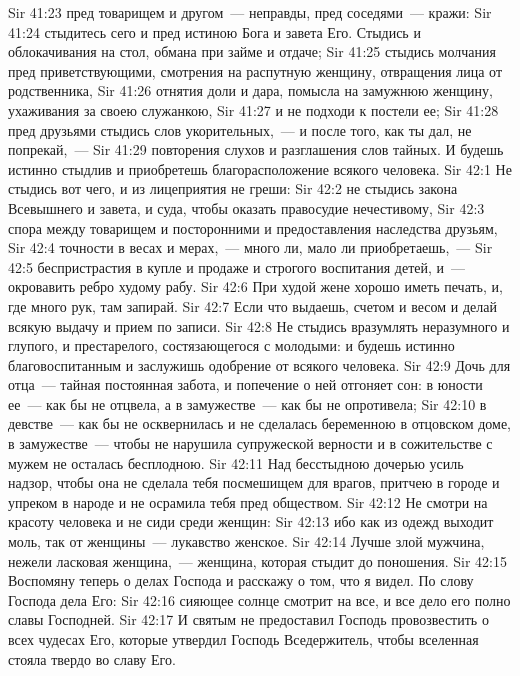 \vs Sir 41:23 пред товарищем и другом~--- неправды, пред соседями~--- кражи:
\vs Sir 41:24 стыдитесь сего и пред истиною Бога и завета Его. Стыдись и облокачивания на стол, обмана при займе и отдаче;
\vs Sir 41:25 стыдись молчания пред приветствующими, смотрения на распутную женщину, отвращения лица от родственника,
\vs Sir 41:26 отнятия доли и дара, помысла на замужнюю женщину, ухаживания за своею служанкою,
\vs Sir 41:27 и не подходи к постели ее;
\vs Sir 41:28 пред друзьями стыдись слов укорительных,~--- и после того, как ты дал, не попрекай,~---
\vs Sir 41:29 повторения слухов и разглашения слов тайных. И будешь истинно стыдлив и приобретешь благорасположение всякого человека.
\vs Sir 42:1 Не стыдись вот чего, и из лицеприятия не греши:
\vs Sir 42:2 не стыдись  закона Всевышнего и завета, и суда, чтобы оказать правосудие нечестивому,
\vs Sir 42:3 спора между товарищем и посторонними и предоставления наследства друзьям,
\vs Sir 42:4 точности в весах и мерах,~--- много ли, мало ли приобретаешь,~---
\vs Sir 42:5 беспристрастия в купле и продаже и строгого воспитания детей, и~--- окровавить ребро худому рабу.
\vs Sir 42:6 При худой жене хорошо иметь печать, и, где много рук, там запирай.
\vs Sir 42:7 Если что выдаешь,  счетом и весом и делай всякую выдачу и прием по записи.
\vs Sir 42:8 Не стыдись вразумлять неразумного и глупого, и престарелого, состязающегося с молодыми: и будешь истинно благовоспитанным и заслужишь одобрение от всякого человека.
\rsbpar\vs Sir 42:9 Дочь для отца~--- тайная постоянная забота, и попечение о ней отгоняет сон: в юности ее~--- как бы не отцвела, а в замужестве~--- как бы не опротивела;
\vs Sir 42:10 в девстве~--- как бы не осквернилась и не сделалась беременною в отцовском доме, в замужестве~--- чтобы не нарушила супружеской верности и в сожительстве с мужем не осталась бесплодною.
\vs Sir 42:11 Над бесстыдною дочерью усиль надзор, чтобы она не сделала тебя посмешищем для врагов, притчею в городе и упреком в народе и не осрамила тебя пред обществом.
\vs Sir 42:12 Не смотри на красоту человека и не сиди среди женщин:
\vs Sir 42:13 ибо как из одежд выходит моль, так от женщины~--- лукавство женское.
\vs Sir 42:14 Лучше злой мужчина, нежели ласковая женщина,~--- женщина, которая стыдит до поношения.
\rsbpar\vs Sir 42:15 Воспомяну теперь о делах Господа и расскажу о том, что я видел. По слову Господа  дела Его:
\vs Sir 42:16 сияющее солнце смотрит на все, и все дело его полно славы Господней.
\vs Sir 42:17 И святым не предоставил Господь провозвестить о всех чудесах Его, которые утвердил Господь Вседержитель, чтобы вселенная стояла твердо во славу Его.
